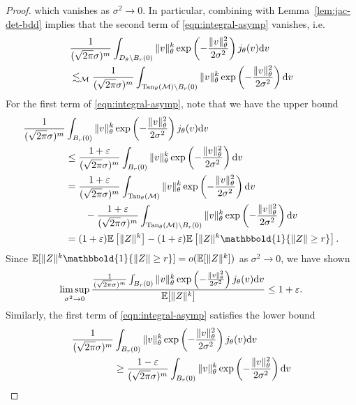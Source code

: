 \documentclass[preprint]{imsart}
\theoremstyle{plain}
\theoremstyle{definition}
\newcommand{\ind}{\mathbbold{1}}
\newcommand{\Ebb}{\mathbb{E}}
\newcommand{\Mcal}{\mathcal{M}}
\newcommand{\diff}{\textnormal{d}}
\DeclareMathOperator{\Tan}{Tan}
\begin{document}
\begin{appendix}
\begin{proof}
    which vanishes as $\sigma^2\to 0$.
    In particular, combining with Lemma~\ref{lem:jac-det-bdd} implies that the second term of \eqref{eqn:integral-asymp} vanishes, i.e.
    \begin{align*}
        &\frac{1}{(\sqrt{2\pi}\sigma)^m}\int_{D_{\theta}\setminus B_r(0)}\|v\|^k_{\theta}\exp\left(-\frac{\|v\|^2_{\theta}}{2\sigma^2}\right)j_{\theta}(v)\diff v \\
        &\lesssim_{\Mcal} \frac{1}{(\sqrt{2\pi}\sigma)^m}\int_{\Tan_{\theta}(\Mcal)\setminus B_r(0)}\|v\|^k_{\theta}\exp\left(-\frac{\|v\|^2_{\theta}}{2\sigma^2}\right)\diff v
    \end{align*}
    For the first term of \eqref{eqn:integral-asymp}, note that we have the upper bound    
    \begin{align*}
        \frac{1}{(\sqrt{2\pi}\sigma)^m}&\int_{B_r(0)}\|v\|^k_{\theta}\exp\left(-\frac{\|v\|^2_{\theta}}{2\sigma^2}\right)j_{\theta}(v)\diff v \\
        &\le \frac{1+\varepsilon}{(\sqrt{2\pi}\sigma)^m}\int_{B_r(0)}\|v\|^k_{\theta}\exp\left(-\frac{\|v\|^2_{\theta}}{2\sigma^2}\right)\diff v \\
        &= \frac{1+\varepsilon}{(\sqrt{2\pi}\sigma)^m}\int_{\Tan_{\theta}(\Mcal)}\|v\|_{\theta}^k\exp\left(-\frac{\|v\|^2_{\theta}}{2\sigma^2}\right)\diff v \\
        &\qquad- \frac{1+\varepsilon}{(\sqrt{2\pi}\sigma)^m}\int_{\Tan_{\theta}(\Mcal)\setminus B_{r}(0)}\|v\|^k_{\theta}\exp\left(-\frac{\|v\|^2_{\theta}}{2\sigma^2}\right)\diff v \\
        &= (1+\varepsilon)\Ebb\left[\|Z\|^k\right] - (1+\varepsilon)\Ebb\left[\|Z\|^k\ind\{\|Z\|\ge r\}\right].
    \end{align*}
    Since $\Ebb[\|Z\|^k\ind\{\|Z\|\ge r\}]=o(\Ebb[\|Z\|^k])$ as $\sigma^2\to 0$, we have shown
    \begin{equation*}
        \limsup_{\sigma^2\to 0}\frac{\frac{1}{(\sqrt{2\pi}\sigma)^m}\int_{B_r(0)}\|v\|^k_{\theta}\exp\left(-\frac{\|v\|^2_{\theta}}{2\sigma^2}\right)j_{\theta}(v)\diff v}{\Ebb[\|Z\|^k]} \le 1+\varepsilon.
    \end{equation*}
    Similarly, the first term of \eqref{eqn:integral-asymp} satisfies the lower bound
    \begin{align*}
        \frac{1}{(\sqrt{2\pi}\sigma)^m}&\int_{B_r(0)}\|v\|^k_{\theta}\exp\left(-\frac{\|v\|^2_{\theta}}{2\sigma^2}\right)j_{\theta}(v)\diff v \\
        &\ge \frac{1-\varepsilon}{(\sqrt{2\pi}\sigma)^m}\int_{B_r(0)}\|v\|^k_{\theta}\exp\left(-\frac{\|v\|^2_{\theta}}{2\sigma^2}\right)\diff v \\

\end{align*}
\end{proof}
\end{appendix}
\end{document}
